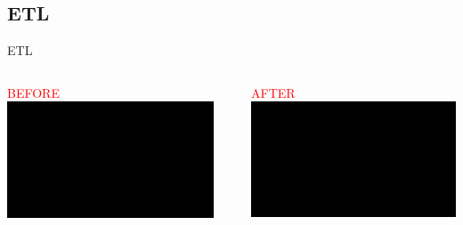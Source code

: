 \documentclass{beamer}
\begin{document}
\subsection{ETL}
\begin{frame}{ETL}

\begin{columns}

\begin{column}{0.49\textwidth}
\begin{center}
\textcolor{red}{BEFORE}
%
\includegraphics[scale = 0.2]{pictures/black.png}
\end{center}
\end{column}

\begin{column}{.02\textwidth}
\rule{.1mm}{0.7\textheight}
\end{column}

\begin{column}{0.49\textwidth}
\begin{center}
\textcolor{red}{AFTER}
%
\includegraphics[scale = 0.2]{pictures/black.png}
\end{center}
\end{column}
\end{columns}

\end{frame}
\end{document}

